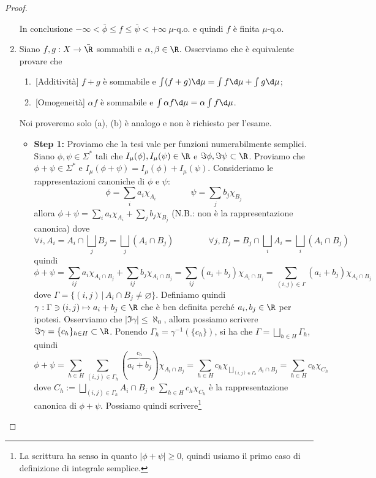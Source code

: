 \begin{proof}
\begin{enumerate}
        In conclusione $-\infty < \bar \phi \leq f \leq \bar\psi < +\infty\ \mu$-q.o. e quindi $f$ è finita $\mu$-q.o.
        \item Siano $f,g:X\to \bar\R$ sommabili e $\alpha,\beta \in \R$. Osserviamo che è equivalente provare che 
        \begin{enumerate}
            \item \,[Additività] $f+g$ è sommabile e $\int(f+g)\d\mu = \int f \d \mu + \int g \d \mu$;
            \item \,[Omogeneità] $\alpha f$ è sommabile e $\int\alpha f\d\mu = \alpha \int f \d \mu$.
        \end{enumerate}
        Noi proveremo solo (a), (b) è analogo e non è richiesto per l'esame.
        \begin{itemize}
            \item \textbf{Step 1:} Proviamo che la tesi vale per funzioni numerabilmente semplici. Siano $\phi, \psi\in \Sigma^*$ tali che $I_\mu(\phi), I_{\mu}(\psi)\in \R$ e $\Im\phi,\Im\psi \subset \R$. Proviamo che $\phi+\psi \in \Sigma^*$ e $I_\mu(\phi+\psi)=I_\mu(\phi)+I_\mu(\psi)$. Consideriamo le rappresentazioni canoniche di $\phi$ e $\psi$:
            \[\phi = \sum_{i}a_i\chi_{A_i}\qquad \qquad \psi = \sum_jb_j\chi_{B_j}\]
            allora  $\phi +\psi = \sum_{i}a_i\chi_{A_i}+\sum_jb_j\chi_{B_j}$ (N.B.: non è la rappresentazione canonica) dove 
            \[\forall i, A_i= A_i\cap \bigsqcup_jB_j = \bigsqcup _j(A_i\cap B_j)\qquad \qquad \forall j, B_j= B_j\cap \bigsqcup_iA_i = \bigsqcup _i(A_i\cap B_j)\]
            quindi 
            \[\phi+\psi = \sum_{ij}a_i\chi_{A_i\cap B_j}+\sum_{ij}b_j\chi_{A_i\cap B_j} = \sum_{ij}(a_i+b_j)\chi_{A_i\cap B_j} = \sum_{(i,j)\in \Gamma}(a_i+b_j)\chi_{A_i\cap B_j}\]
            dove $\Gamma = \{(i,j)\,|\,A_i\cap B_j\neq \varnothing\}$. Definiamo quindi $\gamma : \Gamma\ni(i,j) \mapsto a_i+b_j\in \R$ che è ben definita perché $a_i,b_j\in \R$ per ipotesi. Osserviamo che $|\Im\gamma| \leq \aleph_0$, allora possiamo scrivere $\Im\gamma = \{c_h\}_{h\in H}\subset \R$. Ponendo $\Gamma_h = \gamma^{-1}(\{c_h\})$, si ha che $\Gamma = \bigsqcup_{h\in H}\Gamma_h$, quindi 
            \[\phi + \psi = \sum_{h\in H}\sum_{(i,j)\in \Gamma_h}(\overbrace{a_i+b_j}^{c_h})\chi_{A_i\cap B_j} = \sum_{h\in H}c_h\chi_{\bigsqcup_{(i,j)\in \Gamma_h}A_i\cap B_j} = \sum_{h\in H}c_h\chi_{C_h}\]
            dove $C_h:=\bigsqcup_{(i,j)\in \Gamma_h}A_i\cap B_j$ e $\sum_{h\in H}c_h\chi_{C_h}$ è la rappresentazione canonica di $\phi+\psi$. Possiamo quindi scrivere\footnote{La scrittura ha senso in quanto $|\phi+\psi|\geq 0$, quindi usiamo il primo caso di definizione di integrale semplice.}

\end{itemize}
\end{enumerate}
\end{proof}
